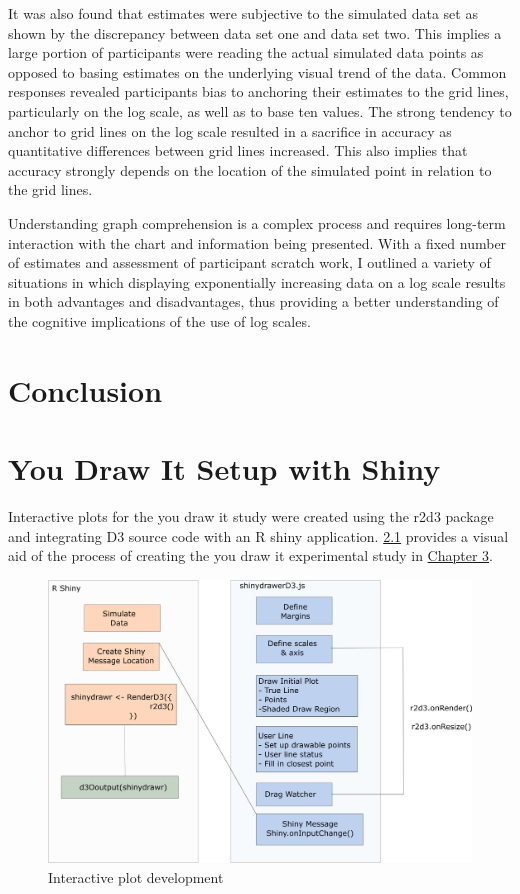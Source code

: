 \documentclass[print]{nuthesis}
\begin{document}
It was also found that estimates were subjective to the simulated data set as shown by the discrepancy between data set one and data set two.
This implies a large portion of participants were reading the actual simulated data points as opposed to basing estimates on the underlying visual trend of the data.
Common responses revealed participants bias to anchoring their estimates to the grid lines, particularly on the log scale, as well as to base ten values.
The strong tendency to anchor to grid lines on the log scale resulted in a sacrifice in accuracy as quantitative differences between grid lines increased.
This also implies that accuracy strongly depends on the location of the simulated point in relation to the grid lines.

Understanding graph comprehension is a complex process and requires long-term interaction with the chart and information being presented.
With a fixed number of estimates and assessment of participant scratch work, I outlined a variety of situations in which displaying exponentially increasing data on a log scale results in both advantages and disadvantages, thus providing a better understanding of the cognitive implications of the use of log scales.

\hypertarget{conclusion}{%
\chapter{Conclusion}\label{conclusion}}

\appendix

\hypertarget{youdrawit-with-shiny}{%
\chapter{You Draw It Setup with Shiny}\label{youdrawit-with-shiny}}

Interactive plots for the you draw it study were created using the r2d3 package and integrating D3 source code with an R shiny application.
\cref{fig:r2d3-shiny-flowchart} provides a visual aid of the process of creating the you draw it experimental study in \protect\hyperlink{youdrawit}{Chapter 3}.

\begin{figure}[tbp]

{\centering \includegraphics[width=0.8\linewidth,]{images/r2d3+shiny-inkscape} 

}

\caption{Interactive plot development}\label{fig:r2d3-shiny-flowchart}
\end{figure}
\end{document}
